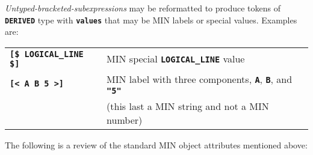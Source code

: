 \documentclass[12pt]{article}
\newcommand{\TT}[1]{{\tt \bfseries #1}}
\begin{document}
{\em Untyped-bracketed-subexpressions} may be reformatted to
produce tokens of \TT{DERIVED} type with \TT{values} that may be
MIN labels or special values.  Examples are:
\begin{center}
\begin{tabular}{ll}
\TT{[\$ LOGICAL\_LINE \$]}	& MIN special \TT{LOGICAL\_LINE} value \\
\TT{[< A B 5 >]}	& MIN label with three components, \TT{A}, \TT{B},
			  and \TT{"5"} \\
			& (this last a MIN string and not a MIN number) \\
\end{tabular}
\end{center}

The following is a review of the standard MIN object attributes
mentioned above:
\end{document}
